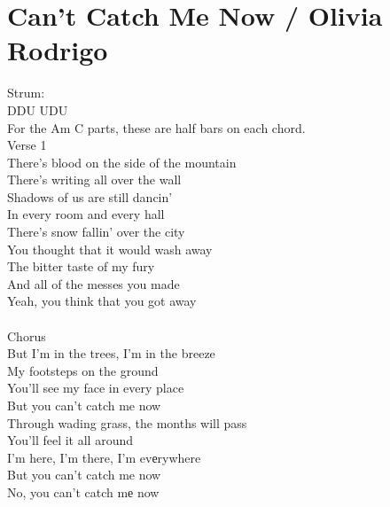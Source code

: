 \section{Can't Catch Me Now / Olivia Rodrigo}\label{sec:cantcatchmenow}

\Aminor
\Cmajor
\Fmajor
\Dminor
\Gmajor
\Eminor

Strum: \\
DDU UDU \\

For the Am C parts, these are half bars on each chord.\\

Verse 1\\
There's blood on the side of the mountain\\
There's writing all over the wall\\
Shadows of us are still dancin'\\
In every room and every hall\\
There's snow fallin' over the city\\
You thought that it would wash away\\
The bitter taste of my fury\\
And all of the messes you made\\
Yeah, you think that you got away\\
\\
Chorus\\
But I'm in the trees, I'm in the breeze\\
My footsteps on the ground\\
You'll see my face in every place\\
But you can't catch me now\\
Through wading grass, the months will pass\\
You'll feel it all around\\
I'm here, I'm there, I'm evеrywhere\\
But you can't catch me now\\
No, you can't catch mе now \\

